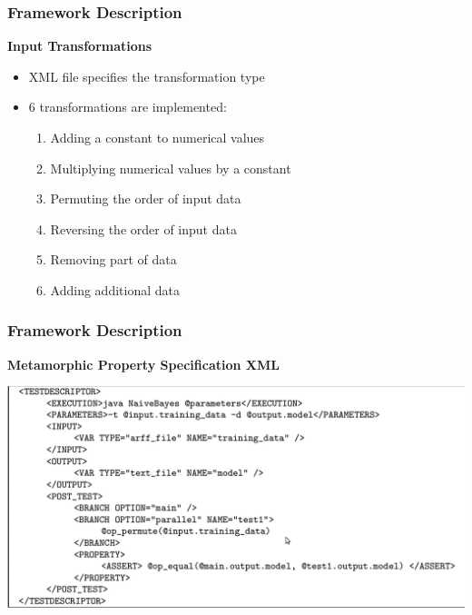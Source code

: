 \documentclass[compress,red]{beamer}
\begin{document}
\frame
{
	\frametitle{Framework Description}
	\textbf{Input Transformations}
	\begin{itemize}
		\item XML file specifies the transformation type
		\pause
		\item[] 6 transformations are implemented:
				\begin{enumerate}
					\item Adding a constant to numerical values
					\item Multiplying numerical values by a constant
					\item Permuting the order of input data
					\item Reversing the order of input data
					\item Removing part of data
					\item Adding additional data
				\end{enumerate}
	\end{itemize}
}


\frame
{
	\frametitle{Framework Description}
	\textbf{Metamorphic Property Specification XML}
	\begin{center}
	\includegraphics[scale=0.25]{amst-input-xml.png}
	\end{center}

}
\end{document}
